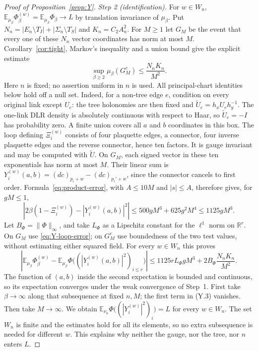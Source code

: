 \documentclass[11pt,a4paper]{article}
\theoremstyle{plain}
\theoremstyle{definition}
\theoremstyle{remark}
\numberwithin{equation}{section}
\newcommand{\R}{\mathbb{R}}
\newcommand{\E}{\mathbb{E}}
\begin{document}
\begin{proof}[Proof of Proposition~\ref{prop:Y}]
\emph{Step 2 (identification).} For $w\in W_n$, $\E_{\mu_\beta}\Phi^{(w)}_\beta=\E_{\mu_\beta}\Phi_\beta\to L$ by translation invariance of
$\mu_\beta$. Put $N_n=|E_n\setminus T_I|+|\Sigma_n\setminus T_S|$ and $K_n=C_2A_n^2$.
For $M\ge1$ let $G_M$ be the event that every one of these $N_n$ vector coordinates has norm at most $M$.
Corollary~\ref{cor:tight}, Markov's inequality and a union bound give the explicit estimate
\begin{equation*}\tag{Y.1}\label{eq:Y-bad-event}
\sup_{\beta\ge2}\mu_\beta(G_M^c)\le\frac{N_nK_n}{M^2}.
\end{equation*}
Here $n$ is fixed; no assertion uniform in $n$ is used.
All principal-chart identities below hold off a null set. Indeed, for a non-tree edge $e$, condition on every original link
except $U_e$: the tree holonomies are then fixed and $\widetilde U_e=h_xU_eh_y^{-1}$.
The one-link DLR density is absolutely continuous with respect to Haar, so $\widetilde U_e=-I$ has probability zero.
A finite union covers all $a$ and $b$ coordinates in this box.
The loop defining $\Xi_i^{(w)}$ consists of four plaquette edges, a connector, four inverse plaquette edges and the reverse
connector, hence ten factors. It is gauge invariant and may be computed with $\widetilde U$.
On $G_M$, each signed vector in these ten exponentials has norm at most $M$.
Their linear sum is $Y_i^{(w)}(a,b)=(dc)_{p_i+w}-(dc)_{p_i'+w}$, since the connector cancels to first order.
Formula~\eqref{eq:product-error}, with $A\le10M$ and $|s|\le A$, therefore gives, for $gM\le1$,
\begin{equation*}\tag{Y.2}\label{eq:Y-loop-error}
\left|2\beta(1-\Xi_i^{(w)})-|Y_i^{(w)}(a,b)|^2\right|
\le500gM^3+625g^2M^4\le1125gM^3.
\end{equation*}
Let $B_\Phi=\|\Phi\|_\infty$, and take $L_\Phi$ as a Lipschitz constant for the $\ell^1$ norm on $\R^r$.
On $G_M$ use \eqref{eq:Y-loop-error}; on $G_M^c$ use boundedness of the two test values, without estimating either squared field.
For every $w\in W_n$ this proves
\begin{equation*}\tag{Y.3}\label{eq:Y-test-error}
\left|\E_{\mu_\beta}\Phi_\beta^{(w)}
 -\E_{\mu_\beta}\Phi\bigl((|Y_i^{(w)}(a,b)|^2)_{i\le r}\bigr)\right|
\le1125rL_\Phi gM^3+2B_\Phi\frac{N_nK_n}{M^2}.
\end{equation*}
The function of $(a,b)$ inside the second expectation is bounded and continuous, so its expectation converges under the
weak convergence of Step~1. First take $\beta\to\infty$ along that subsequence at fixed $n,M$; the first term in (Y.3) vanishes.
Then take $M\to\infty$. We obtain
$\E_{\nu_n}\Phi\bigl((|Y_i^{(w)}|^2)_i\bigr)=L$ for every $w\in W_n$.
The set $W_n$ is finite and the estimates hold for all its elements, so no extra subsequence is needed for different $w$.
This explains why neither the gauge, nor the tree, nor $n$ enters $L$.


\end{proof}
\end{document}
